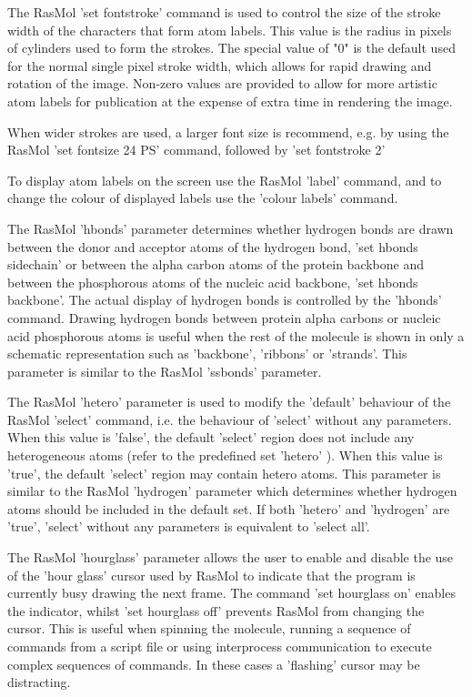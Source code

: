 The RasMol
'set fontstroke'
command is used to control the size of the stroke width of the
characters that form atom labels.  This value is the radius in
pixels of cylinders used to form the strokes.  The special value
of "0" is the default used for the normal single pixel stroke width,
which allows for rapid drawing and rotation of the image.
Non-zero values are provided to allow for more artistic atom
labels for publication at the expense of extra time in rendering
the image.

When wider strokes are used, a larger font size is recommend, e.g.
by using the RasMol
'set fontsize 24 PS'
command, followed by
'set fontstroke 2'

To display atom labels on the screen use the RasMol
'label'
command, and to change the colour of displayed labels use
the
'colour labels'
command.

The RasMol
'hbonds'
parameter determines whether hydrogen bonds are drawn between
the donor and acceptor atoms of the hydrogen bond,
'set hbonds sidechain'
or between the alpha carbon atoms of the protein backbone and between
the phosphorous atoms of the nucleic acid backbone,
'set hbonds backbone'.
The actual display of hydrogen bonds is controlled by the
'hbonds'
command. Drawing hydrogen bonds between protein alpha carbons or
nucleic acid phosphorous atoms is useful when the rest of the molecule
is shown in only a schematic representation such as
'backbone',
'ribbons'
or
'strands'.
This parameter is similar to the RasMol
'ssbonds'
parameter.

The RasMol
'hetero'
parameter is used to modify the 'default' behaviour of the RasMol
'select'
command, i.e. the behaviour of
'select'
without any parameters. When this value is
'false',
the default
'select'
region does not include any heterogeneous atoms (refer to the
predefined set
'hetero'
). When this value is
'true',
the default
'select'
region may contain hetero atoms. This parameter is similar to
the RasMol
'hydrogen'
parameter which determines whether hydrogen atoms should be
included in the default set. If both
'hetero'
and
'hydrogen'
are
'true',
'select'
without any parameters is equivalent to
'select all'.

The RasMol
'hourglass'
parameter allows the user to enable and disable the use of the 'hour
glass' cursor used by RasMol to indicate that the program is currently
busy drawing the next frame. The command
'set hourglass on'
enables the indicator, whilst
'set hourglass off'
prevents RasMol from changing the cursor. This is useful when spinning
the molecule, running a sequence of commands from a script file or
using interprocess communication to execute complex sequences of
commands. In these cases a 'flashing' cursor may be distracting.

